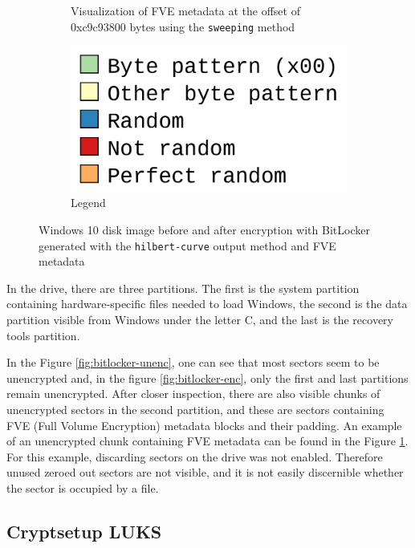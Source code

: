 \documentclass[
  digital, %
  color,   %
  oneside, %
  lof,     %
  nolot,     %
]{fithesis4}
\begin{document}
\begin{figure}
\begin{subfigure}[t]{0.45\textwidth}
    \caption{Visualization of FVE metadata at the offset of 0xc9c93800 bytes using the \texttt{sweeping} method}
    \label{fig:bitlocker-metadata}
  \end{subfigure}
  \hfill
  \begin{subfigure}[t]{0.45\textwidth}
    \centering
    \includegraphics[width=\textwidth]{legend.png}
    \caption{Legend}
    \label{fig:bitlocker-legend}
  \end{subfigure}
  \caption{Windows 10 disk image before and after encryption with BitLocker generated with the \texttt{hilbert-curve} output method and FVE metadata}
  \label{fig:bitlocker}
\end{figure}
In the drive, there are three partitions.
The first is the system partition containing hardware-specific files needed to load Windows,\cite{winpart} the second is the data partition visible from Windows under the letter C, and the last is the recovery tools partition.\cite{winbiospart}

In the Figure \ref{fig:bitlocker-unenc}, one can see that most sectors seem to be unencrypted and, in the figure \ref{fig:bitlocker-enc}, only the first and last partitions remain unencrypted.
After closer inspection, there are also visible chunks of unencrypted sectors in the second partition, and these are sectors containing FVE (Full Volume Encryption) metadata blocks and their padding.\cite{metz22}
An example of an unencrypted chunk containing FVE metadata can be found in the Figure \ref{fig:bitlocker-metadata}. 
For this example, discarding sectors on the drive was not enabled. 
Therefore unused zeroed out sectors are not visible, and it is not easily discernible whether the sector is occupied by a file.

\subsection{Cryptsetup LUKS}
\label{ssec:cryptsetup-luks}
\end{document}
